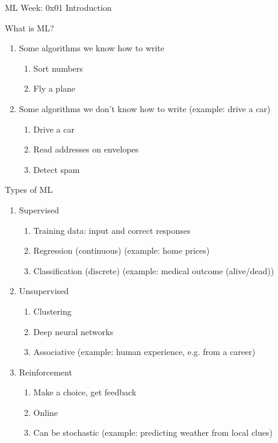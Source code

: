 \documentclass{report}
\begin{document}
\centerline{\large ML Week: 0x01 \hspace{2mm}  Introduction}
\vspace{10mm}

What is ML?
\begin{enumerate}
\item Some algorithms we know how to write
  \begin{enumerate}
  \item Sort numbers
  \item Fly a plane
  \end{enumerate}
\item Some algorithms we don't know how to write (example: drive a car)
  \begin{enumerate}
  \item Drive a car 
  \item Read addresses on envelopes
  \item Detect spam
  \end{enumerate}
\end{enumerate}

Types of ML
\begin{enumerate}
\item Supervised
  \begin{enumerate}
  \item Training data: input and correct responses
  \item Regression (continuous) (example: home prices)
  \item Classification (discrete) (example: medical outcome (alive/dead))
  \end{enumerate}
\item Unsupervised
  \begin{enumerate}
  \item Clustering
  \item Deep neural networks
  \item Associative (example: human experience, e.g. from a career)
  \end{enumerate}
\item Reinforcement
  \begin{enumerate}
  \item Make a choice, get feedback
  \item Online
  \item Can be stochastic (example: predicting weather from local clues)
  \end{enumerate}
\end{enumerate}
\end{document}
